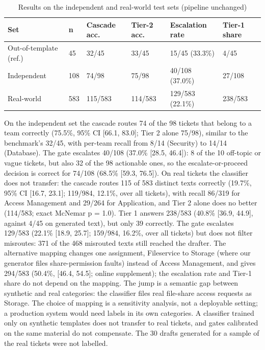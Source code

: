 \documentclass[conference,a4paper]{IEEEtran}
\begin{document}
\begin{table}[!t]
\caption{Results on the independent and real-world test sets (pipeline unchanged)}\label{tab:ext}
\centering
\scriptsize
\setlength{\tabcolsep}{3pt}
\begin{tabular}{|P{0.250}|P{0.090}|P{0.160}|P{0.150}|P{0.200}|P{0.150}|}
\hline
\textbf{Set} & \textbf{n} & \textbf{Cascade acc.} & \textbf{Tier-2 acc.} & \textbf{Escalation rate} & \textbf{Tier-1 share}\\ \hline\hline
Out-of-template (ref.) & 45 & 32/45 & 33/45 & 15/45 (33.3\%) & 4/45\\ \hline
Independent & 108 & 74/98 & 75/98 & 40/108 (37.0\%) & 27/108\\ \hline
Real-world & 583 & 115/583 & 114/583 & 129/583 (22.1\%) & 238/583\\ \hline
\end{tabular}
\end{table}

On the independent set the cascade routes 74 of the 98 tickets that belong to a team correctly (75.5\%, 95\% CI [66.1, 83.0]; Tier 2 alone 75/98), similar to the benchmark's 32/45, with per-team recall from 8/14 (Security) to 14/14 (Database). The gate escalates 40/108 (37.0\% [28.5, 46.4]): 8 of the 10 off-topic or vague tickets, but also 32 of the 98 actionable ones, so the escalate-or-proceed decision is correct for 74/108 (68.5\% [59.3, 76.5]). On real tickets the classifier does not transfer: the cascade routes 115 of 583 distinct texts correctly (19.7\%, 95\% CI [16.7, 23.1]; 119/984, 12.1\%, over all tickets), with recall 86/319 for Access Management and 29/264 for Application, and Tier 2 alone does no better (114/583; exact McNemar p = 1.0). Tier 1 answers 238/583 (40.8\% [36.9, 44.9], against 4/45 on generated text), but only 39 correctly. The gate escalates 129/583 (22.1\% [18.9, 25.7]; 159/984, 16.2\%, over all tickets) but does not filter misroutes: 371 of the 468 misrouted texts still reached the drafter. The alternative mapping changes one assignment, Fileservice to Storage (where our generator files share-permission faults) instead of Access Management, and gives 294/583 (50.4\%, [46.4, 54.5]; online supplement); the escalation rate and Tier-1 share do not depend on the mapping. The jump is a semantic gap between synthetic and real categories: the classifier files real file-share access requests as Storage. The choice of mapping is a sensitivity analysis, not a deployable setting; a production system would need labels in its own categories. A classifier trained only on synthetic templates does not transfer to real tickets, and gates calibrated on the same material do not compensate. The 30 drafts generated for a sample of the real tickets were not labelled.
\end{document}
